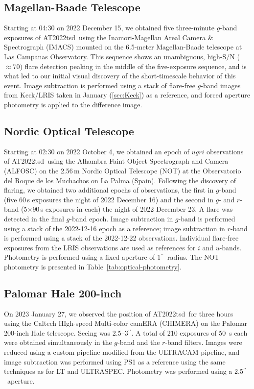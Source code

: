 \documentclass{nature_plusfigure}
\newcommand{\at}{AT2022tsd}
\newcommand{\arcsec}{$^{\prime\prime}$}
\begin{document}
\begin{methods}
\subsection{Magellan-Baade Telescope}
\label{sec:magellan}

Starting at 04:30 on 2022 December 15, we obtained five three-minute $g$-band exposures of \at\ using the Inamori-Magellan Areal Camera \& Spectrograph (IMACS\cite{Dressler2011}) mounted on the 6.5-meter Magellan-Baade telescope at Las Campanas Observatory.  This sequence shows an unambiguous, high-S/N ($\approx70$) flare detection peaking in the middle of the five-exposure sequence, and is what led to our initial visual discovery of the short-timescale behavior of this event.  Image subtraction is performed using a stack of flare-free $g$-band images from Keck/LRIS taken in January (\ref{sec:Keck}) as a reference, and forced aperture photometry is applied to the difference image.

\subsection{Nordic Optical Telescope}
\label{sec:not}

Starting at 02:30 on 2022 October 4, we obtained an epoch of $ugri$ observations of \at\ using the Alhambra Faint Object Spectrograph and Camera (ALFOSC) on the 2.56\,m Nordic Optical Telescope (NOT) at the Observatorio del Roque de los Muchachos on La Palma (Spain). Following the discovery of flaring, we obtained two additional epochs of observations, the first in $g$-band (five 60\,s exposures the night of 2022 December 16) and the second in $g$- and $r$-band (5$\times$90\,s exposures in each) the night of 2022 December 23. A flare was detected in the final $g$-band epoch.  Image subtraction in $g$-band is performed using a stack of the 2022-12-16 epoch as a reference; image subtraction in $r$-band is performed using a stack of the 2022-12-22 observations.  Individual flare-free exposures from the LRIS observations are used as references for $i$ and $u$-bands.  Photometry is performed using a fixed aperture of 1\arcsec\ radius.
The NOT photometry is presented in Table~\ref{tab:optical-photometry}.


\subsection{Palomar Hale 200-inch}
\label{sec:chimera}

On 2023 January 27, we observed the position of \at\ for three hours using the Caltech HIgh-speed Multi-color camERA (CHIMERA\cite{Harding2016}) on the Palomar 200-inch Hale telescope. Seeing was 2.5--3\arcsec.
A total of 210 exposures of 50~s each were obtained simultaneously in the $g$-band and the $r$-band filters. Images were reduced using a custom pipeline modified from the ULTRACAM pipeline\cite{Dhillon2007}, and image subtraction was performed using PS1 as a reference using the same techniques as for LT and ULTRASPEC. Photometry was performed using a 2.5\arcsec\ aperture.


\end{methods}
\end{document}
